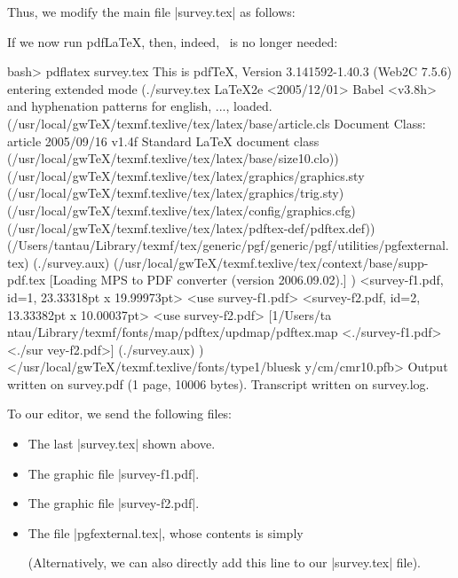 Thus, we modify the main file |survey.tex| as follows:
If we now run pdf\LaTeX, then, indeed, \pgfname\ is no longer needed:
\begin{codeexample}
bash> pdflatex survey.tex
This is pdfTeX, Version 3.141592-1.40.3 (Web2C 7.5.6)
entering extended mode
(./survey.tex
LaTeX2e <2005/12/01>
Babel <v3.8h> and hyphenation patterns for english, ..., loaded.
(/usr/local/gwTeX/texmf.texlive/tex/latex/base/article.cls
Document Class: article 2005/09/16 v1.4f Standard LaTeX document class
(/usr/local/gwTeX/texmf.texlive/tex/latex/base/size10.clo))
(/usr/local/gwTeX/texmf.texlive/tex/latex/graphics/graphics.sty
(/usr/local/gwTeX/texmf.texlive/tex/latex/graphics/trig.sty)
(/usr/local/gwTeX/texmf.texlive/tex/latex/config/graphics.cfg)
(/usr/local/gwTeX/texmf.texlive/tex/latex/pdftex-def/pdftex.def))
(/Users/tantau/Library/texmf/tex/generic/pgf/generic/pgf/utilities/pgfexternal.
tex) (./survey.aux)
(/usr/local/gwTeX/texmf.texlive/tex/context/base/supp-pdf.tex
[Loading MPS to PDF converter (version 2006.09.02).]
) <survey-f1.pdf, id=1, 23.33318pt x 19.99973pt> <use survey-f1.pdf>
<survey-f2.pdf, id=2, 13.33382pt x 10.00037pt> <use survey-f2.pdf> [1{/Users/ta
ntau/Library/texmf/fonts/map/pdftex/updmap/pdftex.map} <./survey-f1.pdf> <./sur
vey-f2.pdf>] (./survey.aux) )</usr/local/gwTeX/texmf.texlive/fonts/type1/bluesk
y/cm/cmr10.pfb>
Output written on survey.pdf (1 page, 10006 bytes).
Transcript written on survey.log.
\end{codeexample}

To our editor, we send the following files:
\begin{itemize}
\item The last |survey.tex| shown above.
\item The graphic file |survey-f1.pdf|.
\item The graphic file |survey-f2.pdf|.
\item The file |pgfexternal.tex|, whose contents is simply
\begin{codeexample}
\long{}
\end{codeexample}
  (Alternatively, we can also directly add this line to our
  |survey.tex| file).
\end{itemize}

